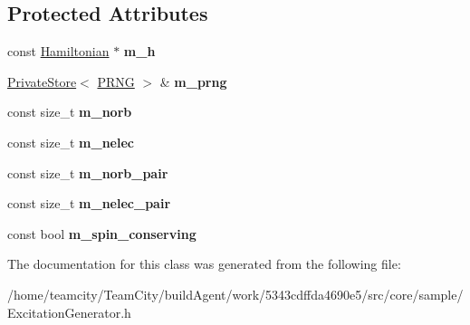 \subsection*{Protected Attributes}
\begin{DoxyCompactItemize}
\item 
const \hyperlink{classHamiltonian}{Hamiltonian} $\ast$ {\bfseries m\+\_\+h}\hypertarget{classExcitationGenerator_a6977169b1ae19e3fd1bb56caa3729f9e}{}\label{classExcitationGenerator_a6977169b1ae19e3fd1bb56caa3729f9e}

\item 
\hyperlink{classPrivateStore}{Private\+Store}$<$ \hyperlink{classPRNG}{P\+R\+NG} $>$ \& {\bfseries m\+\_\+prng}\hypertarget{classExcitationGenerator_ab847f96bc5a110a7ac7e4a7caa302b1e}{}\label{classExcitationGenerator_ab847f96bc5a110a7ac7e4a7caa302b1e}

\item 
const size\+\_\+t {\bfseries m\+\_\+norb}\hypertarget{classExcitationGenerator_ad9eedf52cd62743aad418d2d9292e13b}{}\label{classExcitationGenerator_ad9eedf52cd62743aad418d2d9292e13b}

\item 
const size\+\_\+t {\bfseries m\+\_\+nelec}\hypertarget{classExcitationGenerator_ac5d7f795b88e2a952c8ede70cc49a850}{}\label{classExcitationGenerator_ac5d7f795b88e2a952c8ede70cc49a850}

\item 
const size\+\_\+t {\bfseries m\+\_\+norb\+\_\+pair}\hypertarget{classExcitationGenerator_acd7460a6297a1d8b6d9bddd9b2caa7da}{}\label{classExcitationGenerator_acd7460a6297a1d8b6d9bddd9b2caa7da}

\item 
const size\+\_\+t {\bfseries m\+\_\+nelec\+\_\+pair}\hypertarget{classExcitationGenerator_a838d5cb60f87767b0a07cc2704b8d171}{}\label{classExcitationGenerator_a838d5cb60f87767b0a07cc2704b8d171}

\item 
const bool {\bfseries m\+\_\+spin\+\_\+conserving}\hypertarget{classExcitationGenerator_aa70e9f623ce10d80a0df6bdf836403ae}{}\label{classExcitationGenerator_aa70e9f623ce10d80a0df6bdf836403ae}

\end{DoxyCompactItemize}


The documentation for this class was generated from the following file\+:\begin{DoxyCompactItemize}
\item 
/home/teamcity/\+Team\+City/build\+Agent/work/5343cdffda4690e5/src/core/sample/Excitation\+Generator.\+h\end{DoxyCompactItemize}
